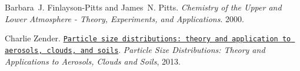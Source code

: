 
\begin{DoxyDescription}
\item[\label{_CITEREF_Finlayson-Pitts2000}%
\mbox{[}1\mbox{]}]Barbara~J. Finlayson-\/\+Pitts and James~N. Pitts. {\itshape Chemistry of the Upper and Lower Atmosphere -\/ Theory, Experiments, and Applications}. 2000.


\item[\label{_CITEREF_Zender2002}%
\mbox{[}2\mbox{]}]Charlie Zender. \href{http://dust.ess.uci.edu/facts/psd/psd.pdf}{\tt Particle size distributions\+: theory and application to aerosols, clouds, and soils}. {\itshape Particle Size Distributions\+: Theory and Applications to Aerosols, Clouds and Soils}, 2013.


\end{DoxyDescription}